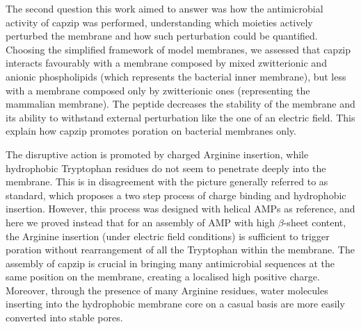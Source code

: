 The second question this work aimed to answer was how the antimicrobial activity of capzip was performed, understanding which moieties actively perturbed the membrane and how such perturbation could be quantified. Choosing the simplified framework of model membranes, we assessed that capzip interacts favourably with a membrane composed by mixed zwitterionic and anionic phospholipids (which represents the bacterial inner membrane), but less with a membrane composed only by zwitterionic ones (representing the mammalian membrane). The peptide decreases the stability of the membrane and its ability to withstand external perturbation like the one of an electric field. This explain how capzip promotes poration on bacterial membranes only.

The disruptive action is promoted by charged Arginine insertion, while hydrophobic Tryptophan residues do not seem to penetrate deeply into the membrane.
%
This is in disagreement with the picture generally referred to as standard, which proposes a two step process of charge binding and hydrophobic insertion. However, this process was designed with helical AMPs as reference, and here we proved instead that for an assembly of AMP with high $\beta$-sheet content, the Arginine insertion (under electric field conditions) is sufficient to trigger poration without rearrangement of all the Tryptophan within the membrane.
%
The assembly of capzip is crucial in bringing many antimicrobial sequences at the same position on the membrane, creating a localised high positive charge. Moreover, through the presence of many Arginine residues, water molecules inserting into the hydrophobic membrane core on a casual basis are more easily converted into stable pores.

